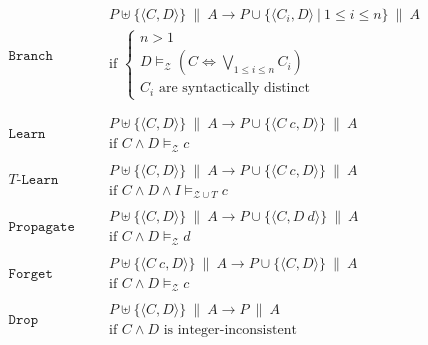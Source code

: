 \documentclass{llncs}
\newcommand{\tr}[1]{\ensuremath{\mathtt{#1}}}
\newcommand{\ttr}[1]{\ensuremath{T\text{-}\mathtt{#1}}}
\newcommand{\state}[2]{\ensuremath{#1\ \|\ #2}}
\newcommand{\subp}[2]{\ensuremath{\langle#1, #2\rangle}}
\newcommand{\Z}[0]{\ensuremath{\mathcal{Z}}}
\newcommand{\modelsz}[0]{\ensuremath{ \models_{\Z} }}
\newcommand{\modelszt}[0]{\ensuremath{ \models_{\Z \cup T} }}
\newcommand{\trans}[0]{\ensuremath{ \longrightarrow }}
\newcommand{\cd}{\subp{C}{D}}
\newcommand{\pa}{\state{P}{A}}
\begin{document}
\begin{figure}[t!]
  \begin{align*}
    \tr{Branch}\ \ &
    \begin{aligned}
      & \state{P \uplus \{ \cd \}}{A} \trans
      \state{P \cup \{\subp{C_i}{D}\ |\ 1 \leq i \leq n\}}{A} \\
      & \text{if } \left\{
        \begin{array}{l}
          n > 1 \\
          D \modelsz (C \Leftrightarrow \bigvee_{1 \leq i \leq n}
          C_i) \\
          C_i \text{ are syntactically distinct}
        \end{array}
      \right.
      \\
    \end{aligned} \\[8pt]
    \tr{Learn}\ \ &
    \begin{aligned}
      & \state{P \uplus \{ \cd \}}{A} \trans
      \state{P \cup \{ \subp{C\ c}{D} \}}{A} \\
      & \text{if $C \wedge D \modelsz c$}
    \end{aligned} \\[8pt]
    \ttr{Learn}\ \ &
    \begin{aligned}
      & \state{P \uplus \{ \cd \}}{A} \trans
      \state{P \cup \{ \subp{C\ c}{D} \} }{A} \\
      & \text{if $C \wedge D \wedge I \modelszt c$}
    \end{aligned} \\[8pt]
    \tr{Propagate}\ \ &
    \begin{aligned}
      & \state{P \uplus \{ \cd \}}{A} \trans
      \state{P \cup \{ \subp{C}{D\ d} \}}{A} \\
      & \text{if $C \wedge D \modelsz d$}
    \end{aligned} \\[8pt]
    \tr{Forget}\ \ &
    \begin{aligned}
      & \state{P \uplus \{ \subp{C\ c}{D} \}}{A} \trans
      \state{P \cup \{ \subp{C}{D} \}}{A} \\
      & \text{if $C \wedge D \modelsz c$}
    \end{aligned} \\[8pt]
    \tr{Drop}\ \ &
    \begin{aligned}
      & \state{P \uplus \{ \cd \}}{A} \trans \pa \\
      & \text{if $C \wedge D$ is integer-inconsistent}
    \end{aligned} \\[8pt]

\end{align*}
\end{figure}
\end{document}
